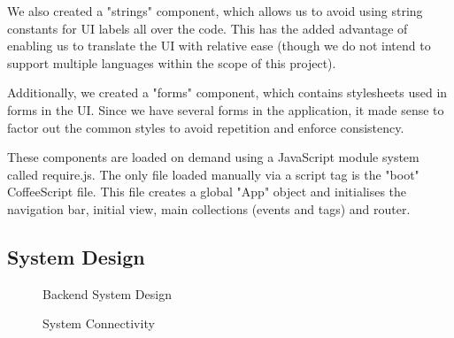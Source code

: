 \documentclass[11pt]{article}
\begin{document}
We also created a "strings" component, which allows us to avoid using string constants for UI labels all over the code. This has the added advantage of enabling us to translate the UI with relative ease (though we do not intend to support multiple languages within the scope of this project).

Additionally, we created a "forms" component, which contains stylesheets used in forms in the UI. Since we have several forms in the application, it made sense to factor out the common styles to avoid repetition and enforce consistency.

These components are loaded on demand using a JavaScript module system called require.js. The only file loaded manually via a script tag is the "boot" CoffeeScript file. This file creates a global "App" object and initialises the navigation bar, initial view, main collections (events and tags) and router.

\subsection {System Design}

\begin{figure}[H]
\centering
{}
\caption{\label{fig:backend-diagram} Backend System Design}
\end{figure}
\begin{figure}[H]
\centering
{}
\caption{\label{fig:backend-diagram} System Connectivity}
\end{figure}
\end{document}
